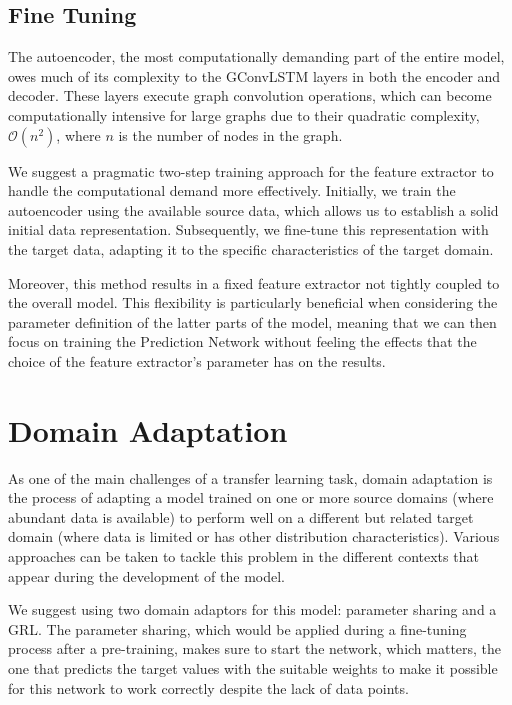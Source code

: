 \subsection{Fine Tuning}

The autoencoder, the most computationally demanding part of the entire model, owes much of its complexity to the \gls{GConvLSTM} layers in both the encoder and decoder. These layers execute graph convolution operations, which can become computationally intensive for large graphs due to their quadratic complexity, $\mathcal{O}(n^2)$, where $n$ is the number of nodes in the graph.

We suggest a pragmatic two-step training approach for the feature extractor to handle the computational demand more effectively. Initially, we train the autoencoder using the available source data, which allows us to establish a solid initial data representation. Subsequently, we fine-tune this representation with the target data, adapting it to the specific characteristics of the target domain.

Moreover, this method results in a fixed feature extractor not tightly coupled to the overall model. This flexibility is particularly beneficial when considering the parameter definition of the latter parts of the model, meaning that we can then focus on training the Prediction Network without feeling the effects that the choice of the feature extractor's parameter has on the results.

\section{Domain Adaptation} \label{sec:domainadap}

As one of the main challenges of a transfer learning task, domain adaptation is the process of adapting a model trained on one or more source domains (where abundant data is available) to perform well on a different but related target domain (where data is limited or has other distribution characteristics). Various approaches can be taken to tackle this problem in the different contexts that appear during the development of the model.

We suggest using two domain adaptors for this model: parameter sharing and a \gls{GRL}. The parameter sharing, which would be applied during a fine-tuning process after a pre-training, makes sure to start the network, which matters, the one that predicts the target values with the suitable weights to make it possible for this network to work correctly despite the lack of data points.

